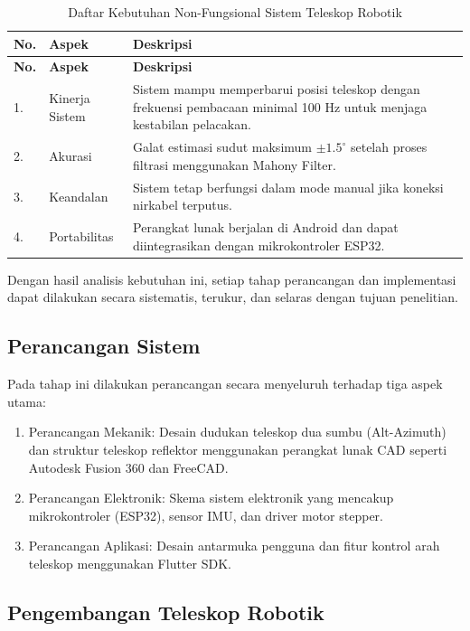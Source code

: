 \begin{longtable}{|b{}|p{}|p{}|}
	\caption{Daftar Kebutuhan Non-Fungsional Sistem Teleskop Robotik}
	\label{table:3.kebutuhanNF}\\
	\hline
	\textbf{No.} & \textbf{Aspek} & \textbf{Deskripsi} \\
	\hline
	\endfirsthead
	\hline
	\textbf{No.} & \textbf{Aspek} & \textbf{Deskripsi} \\
	\hline
	\endhead
	
	1. & Kinerja Sistem & Sistem mampu memperbarui posisi teleskop dengan frekuensi pembacaan minimal 100 Hz untuk menjaga kestabilan pelacakan. \\
	\hline
	2. & Akurasi & Galat estimasi sudut maksimum $\pm 1.5^\circ$ setelah proses filtrasi menggunakan Mahony Filter. \\
	\hline
	3. & Keandalan & Sistem tetap berfungsi dalam mode manual jika koneksi nirkabel terputus. \\
	\hline
	4. & Portabilitas & Perangkat lunak berjalan di Android dan dapat diintegrasikan dengan mikrokontroler ESP32. \\
	\hline
\end{longtable}

\noindent Dengan hasil analisis kebutuhan ini, setiap tahap perancangan dan implementasi dapat dilakukan secara sistematis, terukur, dan selaras dengan tujuan penelitian.




\subsection{Perancangan Sistem} \label{III.Metode.Perancangan}
Pada tahap ini dilakukan perancangan secara menyeluruh terhadap tiga aspek utama:
\begin{enumerate}
	\item Perancangan Mekanik: Desain dudukan teleskop dua sumbu (Alt-Azimuth) dan struktur teleskop reflektor menggunakan perangkat lunak CAD seperti Autodesk Fusion 360 dan FreeCAD.
	\item Perancangan Elektronik: Skema sistem elektronik yang mencakup mikrokontroler (ESP32), sensor IMU, dan driver motor stepper.
	\item Perancangan Aplikasi: Desain antarmuka pengguna dan fitur kontrol arah teleskop menggunakan Flutter SDK.
\end{enumerate}


\subsection{Pengembangan Teleskop Robotik} \label{III.Metode.Teleskop}

